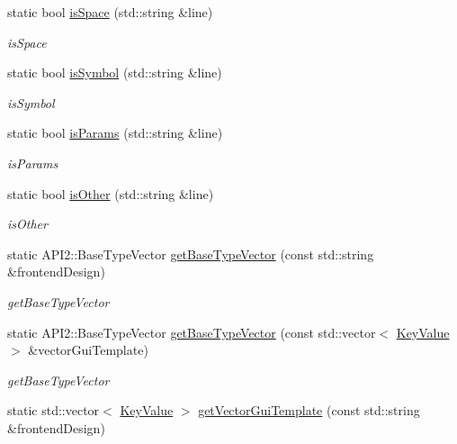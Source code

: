 \begin{DoxyCompactItemize}
static bool \hyperlink{class_a_p_i2_1_1_h_e_l_p_e_r_1_1_user_params_reader_a03c3f38ad3c227fae5e6b394572407b2}{is\-Space} (std\-::string \&line)
\begin{DoxyCompactList}\small\item\em is\-Space \end{DoxyCompactList}\item 
static bool \hyperlink{class_a_p_i2_1_1_h_e_l_p_e_r_1_1_user_params_reader_a9b91e9e3bf76e668cc3d49b0c0fe5810}{is\-Symbol} (std\-::string \&line)
\begin{DoxyCompactList}\small\item\em is\-Symbol \end{DoxyCompactList}\item 
static bool \hyperlink{class_a_p_i2_1_1_h_e_l_p_e_r_1_1_user_params_reader_aefee29440b41d102f825a0a9925bb4bb}{is\-Params} (std\-::string \&line)
\begin{DoxyCompactList}\small\item\em is\-Params \end{DoxyCompactList}\item 
static bool \hyperlink{class_a_p_i2_1_1_h_e_l_p_e_r_1_1_user_params_reader_a8c8ad44f4a1836e5b8d3f135d9fefcca}{is\-Other} (std\-::string \&line)
\begin{DoxyCompactList}\small\item\em is\-Other \end{DoxyCompactList}\item 
static A\-P\-I2\-::\-Base\-Type\-Vector \hyperlink{class_a_p_i2_1_1_h_e_l_p_e_r_1_1_user_params_reader_af195beedbe9deb19993d9d481da5d279}{get\-Base\-Type\-Vector} (const std\-::string \&frontend\-Design)
\begin{DoxyCompactList}\small\item\em get\-Base\-Type\-Vector \end{DoxyCompactList}\item 
static A\-P\-I2\-::\-Base\-Type\-Vector \hyperlink{class_a_p_i2_1_1_h_e_l_p_e_r_1_1_user_params_reader_a226372b7e1252ffc7fa04700b7b677b7}{get\-Base\-Type\-Vector} (const std\-::vector$<$ \hyperlink{struct_a_p_i2_1_1_h_e_l_p_e_r_1_1_key_value}{Key\-Value} $>$ \&vector\-Gui\-Template)
\begin{DoxyCompactList}\small\item\em get\-Base\-Type\-Vector \end{DoxyCompactList}\item 
static std\-::vector$<$ \hyperlink{struct_a_p_i2_1_1_h_e_l_p_e_r_1_1_key_value}{Key\-Value} $>$ \hyperlink{class_a_p_i2_1_1_h_e_l_p_e_r_1_1_user_params_reader_ab4d2956d938ae42b5286f5aadbcbb5eb}{get\-Vector\-Gui\-Template} (const std\-::string \&frontend\-Design)

\end{DoxyCompactItemize}

